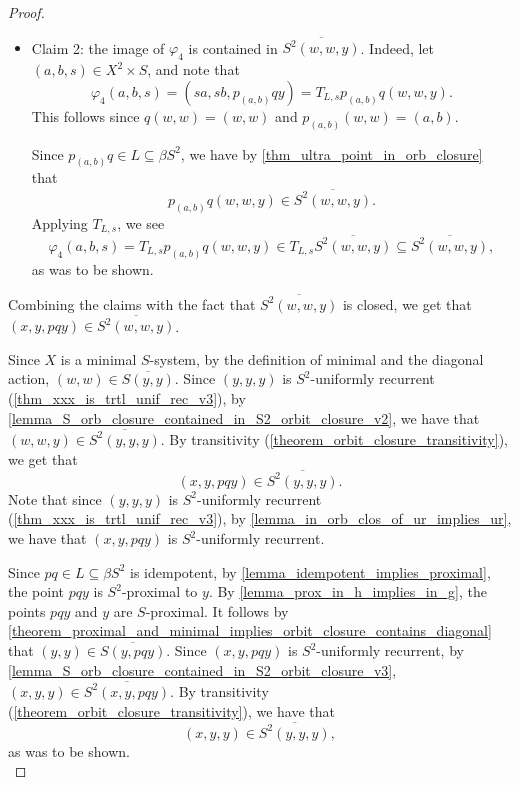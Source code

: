\begin{proof}
\begin{itemize}
        \item Claim 2: the image of $\varphi_4$ is contained in $\overline{S^2 (w,w,y)}$.  Indeed, let $(a,b,s) \in X^2 \times S$, and note that
        \[\varphi_4 (a,b,s) = (sa,sb,p_{(a,b)} q y) = T_{L,s} p_{(a,b)} q (w,w,y).\]
        This follows since $q(w,w) = (w,w)$ and $p_{(a,b)}(w,w) = (a,b)$.
        
        Since $p_{(a,b)}q \in L \subseteq \beta S^2$, we have by \cref{thm_ultra_point_in_orb_closure} that
    \[p_{(a,b)} q (w,w,y) \in \overline{S^2 (w,w,y)}.\]
    Applying $T_{L,s}$, we see
    \[\varphi_4 (a,b,s) = T_{L,s} p_{(a,b)} q (w,w,y) \in T_{L,s} \overline{S^2 (w,w,y)} \subseteq \overline{S^2 (w,w,y)},\]
    as was to be shown.
    \end{itemize}
    Combining the claims with the fact that $\overline{S^2 (w,w,y)}$ is closed, we get that $(x,y,pqy) \in \overline{S^2 (w,w,y)}$.
    
    Since $X$ is a minimal $S$-system, by the definition of minimal and the diagonal action, $(w,w) \in \overline{S(y,y)}$.  Since $(y,y,y)$ is $S^2$-uniformly recurrent (\cref{thm_xxx_is_trtl_unif_rec_v3}), by \cref{lemma_S_orb_closure_contained_in_S2_orbit_closure_v2}, we have that $(w,w,y) \in \overline{S^2(y,y,y)}$. By transitivity (\cref{theorem_orbit_closure_transitivity}), we get that
    \[(x, y, pq y) \in \overline{S^2(y,y,y)}.\]
    Note that since $(y,y,y)$ is $S^2$-uniformly recurrent (\cref{thm_xxx_is_trtl_unif_rec_v3}), by \cref{lemma_in_orb_clos_of_ur_implies_ur}, we have that $(x,y, pq y)$ is $S^2$-uniformly recurrent.
    
    Since $pq \in L \subseteq \beta S^2$ is idempotent, by \cref{lemma_idempotent_implies_proximal}, the point $pq y$ is $S^2$-proximal to $y$. By \cref{lemma_prox_in_h_implies_in_g}, the points $pq y$ and $y$ are $S$-proximal. It follows by \cref{theorem_proximal_and_minimal_implies_orbit_closure_contains_diagonal} that $(y,y) \in \overline{S(y,pqy)}$. Since $(x,y, pq y)$ is $S^2$-uniformly recurrent, by \cref{lemma_S_orb_closure_contained_in_S2_orbit_closure_v3}, $(x, y, y) \in \overline{S^2 (x, y, pq y)}$. By transitivity (\cref{theorem_orbit_closure_transitivity}), we have that
    \[(x, y, y) \in \overline{S^2 (y,y,y)},\]
    as was to be shown.\\


\end{proof}
